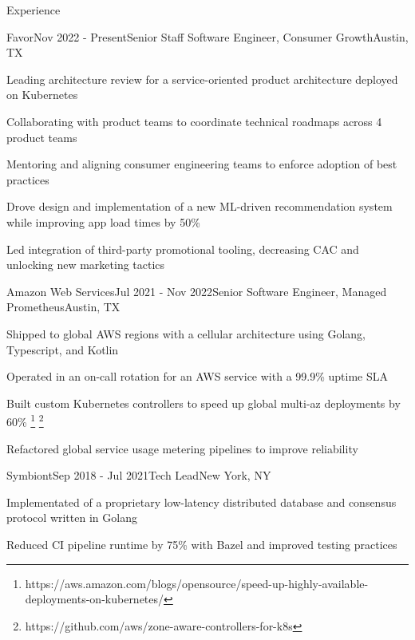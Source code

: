 \documentclass[
	10pt, %
]{resume} %
\begin{document}
\begin{rSection}{Experience}

	\begin{rSubsection}{Favor}{Nov 2022 - Present}{Senior Staff Software Engineer, Consumer Growth}{Austin, TX}
        \item Leading architecture review for a service-oriented product architecture deployed on Kubernetes
        \item Collaborating with product teams to coordinate technical roadmaps across 4 product teams
        \item Mentoring and aligning consumer engineering teams to enforce adoption of best practices
        \item Drove design and implementation of a new ML-driven recommendation system while improving app load times by 50\%
        \item Led integration of third-party promotional tooling, decreasing CAC and unlocking new marketing tactics
	\end{rSubsection}


    \begin{rSubsection}{Amazon Web Services}{Jul 2021 - Nov 2022}{Senior Software Engineer, Managed Prometheus}{Austin, TX}
        \item Shipped to global AWS regions with a cellular architecture using Golang, Typescript, and Kotlin
        \item Operated in an on-call rotation for an AWS service with a 99.9\% uptime SLA
        \item Built custom Kubernetes controllers to speed up global multi-az deployments by 60\% \footnote{https://aws.amazon.com/blogs/opensource/speed-up-highly-available-deployments-on-kubernetes/} \footnote{https://github.com/aws/zone-aware-controllers-for-k8s}
        \item Refactored global service usage metering pipelines to improve reliability
    \end{rSubsection}
    

    \begin{rSubsection}{Symbiont}{Sep 2018 - Jul 2021}{Tech Lead}{New York, NY}
        \item Implementated of a proprietary low-latency distributed database and consensus protocol written in Golang
        \item Reduced CI pipeline runtime by 75\% with Bazel and improved testing practices
    \end{rSubsection}


\end{rSection}
\end{document}
